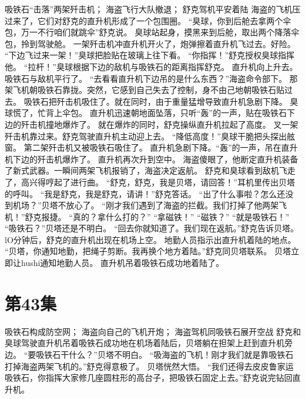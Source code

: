 \documentclass[a4paper,12pt,UTF8,twoside]{ctexbook}
\begin{document}
        吸铁石“击落”两架歼击机； 
        海盗飞行大队撤退； 
        舒克驾机平安着陆   
        海盗的飞机压过来了，它们对舒克的直升机形成了一个包围圈。 
        “臭球，你到后舱去拿两个伞包，万一不行咱们就跳伞”舒克说。 
        臭球站起身，摸黑来到后舱，取出两个降落伞包，拎到驾驶舱。 
        一架歼击机冲直升机开火了，炮弹擦着直升机飞过去。好险。 
        “下边飞过来一架！”臭球把脸贴在玻璃上往下看。 
        “你指挥！”舒克授权臭球指挥他。 
        “拉杆！”臭球根据下边的敌机与吸铁石的距离指挥舒克。 
        直升机向上升去。吸铁石与敌机平行了。 
        “去看看直升机下边吊的是什么东西？”海盗命令部下。 
        那架飞机朝吸铁石靠拢。突然，它感到自己失去了控制，身不由己地朝吸铁石贴过去。 
        吸铁石把歼击机吸住了。就在同时，由于重量猛增导致直升机急剧下降。 
        臭球慌了，忙背上伞包。 
        直升机迅速朝地面坠落，只听“轰”的一声，贴在吸铁石下边的歼击机撞地爆炸了。 
        就在爆炸的同时，舒克操纵直升机拉起了高度。 
        叉一架歼击机靠过来。舒克驾驶直升机主动迎上去。 
        “降低高度！”臭球干脆把头探出舷窗。 
        第二架歼击机又被吸铁石吸住了。 
        直升机急剧下降。“轰”的一声，吊在直升机下边的歼击机爆炸了。 
        直升机再次升到空中。 
        海盗傻眼了，他断定直升机装备了新式武器。一瞬间两架飞机报销了，海盗决定返航。 
        舒克和臭球看到敌机飞走了，高兴得哼起了进行曲。 
        “舒克，舒克，我是贝塔，请回答！”耳机里传出贝塔的呼叫。 
        “我是舒克，我是舒克，请讲！”舒克答话。 
        “出了什么事啦？怎么还没到机场？”贝塔不放心了。 
        “刚才我们遇到了海盗的拦截。我们打掉了他两架飞机！”舒克报捷。 
        “真的？拿什么打的？” 
        “拿磁铁！” 
        “磁铁？” 
        “就是吸铁石！” 
        “吸铁石？”贝塔还是不明白。 
        “回去你就知道了。我们现在返航。”舒克告诉贝塔。 
        lO分钟后，舒克的直升机出现在机场上空。 
        地勤人员指示出直升机着陆的地点。 
        “贝塔，你通知地勤，把绳子剪断。我再换个地方着陆。”舒克同贝塔联系。 
        贝塔立即让hushi通知地勤人员。 
        直升机吊着吸铁石成功地着陆了。   \chapter{第43集} 
        吸铁石构成防空网； 
        海盗向自己的飞机开炮； 
        海盗驾机同吸铁石展开空战   
        舒克和臭球驾驶直升机吊着吸铁石成功地在机场着陆后，贝塔躺在担架上赶到直升机旁边。 
        “要吸铁石干什么？”贝塔不明白。 
        “吸海盗的飞机！刚才我们就是靠吸铁石打掉海盗两架飞机的。”舒克得意极了。 
        贝塔恍然大悟。 
        “我们还得去皮皮鲁家运吸铁石，你指挥大家修几座圆柱形的高台子，把吸铁石固定上去。”舒克说完钻回直升机。 
\end{document}
